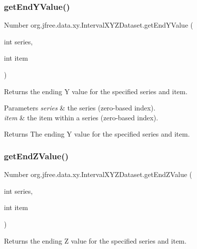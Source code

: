 \subsubsection{\texorpdfstring{get\+End\+Y\+Value()}{getEndYValue()}}
{\footnotesize\ttfamily Number org.\+jfree.\+data.\+xy.\+Interval\+X\+Y\+Z\+Dataset.\+get\+End\+Y\+Value (\begin{DoxyParamCaption}\item[{int}]{series,  }\item[{int}]{item }\end{DoxyParamCaption})}

Returns the ending Y value for the specified series and item.


\begin{DoxyParams}{Parameters}
{\em series} & the series (zero-\/based index). \\
\hline
{\em item} & the item within a series (zero-\/based index).\\
\hline
\end{DoxyParams}
\begin{DoxyReturn}{Returns}
The ending Y value for the specified series and item. 
\end{DoxyReturn}
\mbox{\label{interfaceorg_1_1jfree_1_1data_1_1xy_1_1_interval_x_y_z_dataset_abefbe8d4cd15bbb6ce228498fe7f4122}} 
\subsubsection{\texorpdfstring{get\+End\+Z\+Value()}{getEndZValue()}}
{\footnotesize\ttfamily Number org.\+jfree.\+data.\+xy.\+Interval\+X\+Y\+Z\+Dataset.\+get\+End\+Z\+Value (\begin{DoxyParamCaption}\item[{int}]{series,  }\item[{int}]{item }\end{DoxyParamCaption})}

Returns the ending Z value for the specified series and item.


